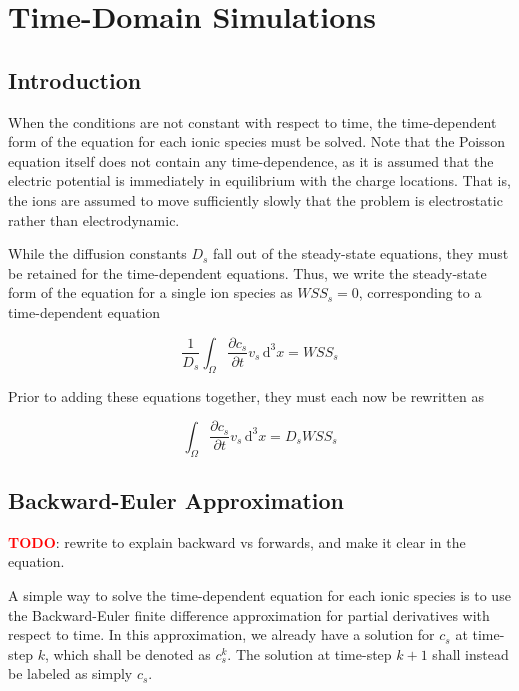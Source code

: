 
\section{Time-Domain Simulations}\label{sec:timedomain}

\subsection{Introduction}\label{subsec:timedomain_intro}

When the conditions are not constant with respect to time,
the time-dependent form of the equation for each ionic species must be solved.
Note that the Poisson equation itself does not contain any time-dependence,
as it is assumed that the electric potential is immediately in equilibrium with the charge locations.
That is, the ions are assumed to move sufficiently slowly that the problem
is electrostatic rather than electrodynamic.

While the diffusion constants $D_s$ fall out of the steady-state equations,
they must be retained for the time-dependent equations.
Thus, we write the steady-state form of the equation for a single ion species as
$WSS_s = 0$,
corresponding to a time-dependent equation

\begin{equation}
  \frac{1}{D_s} \int_\Omega \frac{\partial c_s}{\partial t} v_s \,\mathrm{d}^3x
  = WSS_s
\end{equation}

Prior to adding these equations together, they must each now be rewritten as

\begin{equation}
  \int_\Omega \frac{\partial c_s}{\partial t} v_s \,\mathrm{d}^3x
  = D_s WSS_s
\end{equation}


\subsection{Backward-Euler Approximation}\label{subsec:backward_euler}

\textcolor{red}{\textbf{TODO}}: rewrite to explain backward vs forwards, and make it clear in the equation.

A simple way to solve the time-dependent equation for each ionic species is to use the Backward-Euler
finite difference approximation for partial derivatives with respect to time.
In this approximation, we already have a solution for $c_s$ at time-step $k$,
which shall be denoted as $c_s^k$.
The solution at time-step $k+1$ shall instead be labeled as simply $c_s$.

